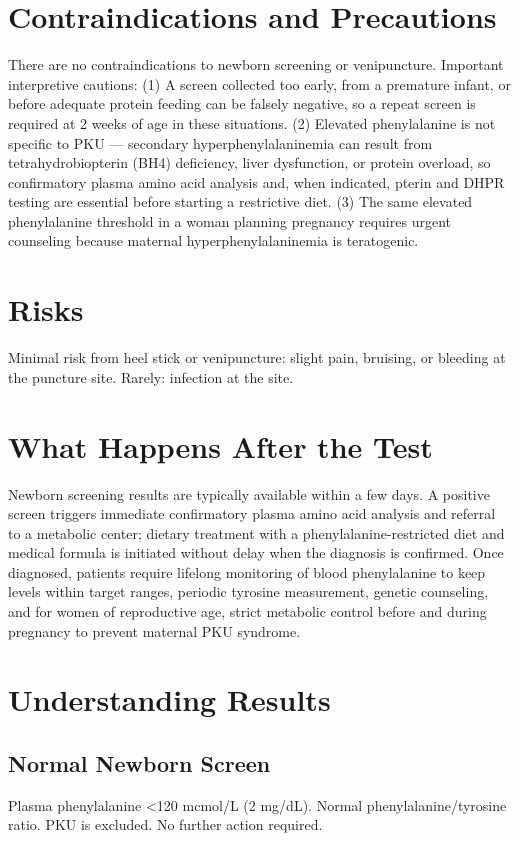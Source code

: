 \section*{Contraindications and Precautions}
There are no contraindications to newborn screening or venipuncture. Important interpretive cautions: (1) A screen collected too early, from a premature infant, or before adequate protein feeding can be falsely negative, so a repeat screen is required at 2 weeks of age in these situations. (2) Elevated phenylalanine is not specific to PKU --- secondary hyperphenylalaninemia can result from tetrahydrobiopterin (BH4) deficiency, liver dysfunction, or protein overload, so confirmatory plasma amino acid analysis and, when indicated, pterin and DHPR testing are essential before starting a restrictive diet. (3) The same elevated phenylalanine threshold in a woman planning pregnancy requires urgent counseling because maternal hyperphenylalaninemia is teratogenic.

\section*{Risks}
Minimal risk from heel stick or venipuncture: slight pain, bruising, or bleeding at the puncture site. Rarely: infection at the site.

\section*{What Happens After the Test}
Newborn screening results are typically available within a few days. A positive screen triggers immediate confirmatory plasma amino acid analysis and referral to a metabolic center; dietary treatment with a phenylalanine-restricted diet and medical formula is initiated without delay when the diagnosis is confirmed. Once diagnosed, patients require lifelong monitoring of blood phenylalanine to keep levels within target ranges, periodic tyrosine measurement, genetic counseling, and for women of reproductive age, strict metabolic control before and during pregnancy to prevent maternal PKU syndrome.

\section*{Understanding Results}

\subsection*{Normal Newborn Screen}
Plasma phenylalanine <120 mcmol/L (2 mg/dL). Normal phenylalanine/tyrosine ratio. PKU is excluded. No further action required.

